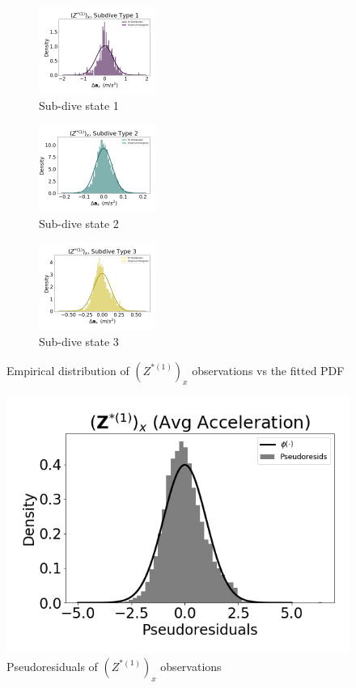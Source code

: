 \documentclass[12pt]{TD-CJS}
\begin{document}

\begin{figure}[ht]
	\centering
	\begin{subfigure}[t]{0.3\textwidth}
        \centering
        \includegraphics[width=1.5in]{../Plots/empirical_hist_Ax_0.png}
        \caption{Sub-dive state 1}
    \end{subfigure}
    \begin{subfigure}[t]{0.3\textwidth}
        \centering
        \includegraphics[width=1.5in]{../Plots/empirical_hist_Ax_1.png}
        \caption{Sub-dive state 2}
    \end{subfigure}
    \begin{subfigure}[t]{0.3\textwidth}
        \centering
        \includegraphics[width=1.5in]{../Plots/empirical_hist_Ax_2.png}
        \caption{Sub-dive state 3}
    \end{subfigure}
    \caption{Empirical distribution of $\left(Z^{*(1)}\right)_x$ observations vs the fitted PDF}
\end{figure}

\begin{figure}
    \centering
    \includegraphics[width=5in]{../Plots/psedoresids_Ax.png}
    \caption{Pseudoresiduals of $\left(Z^{*(1)}\right)_x$ observations}
\end{figure}
\end{document}
